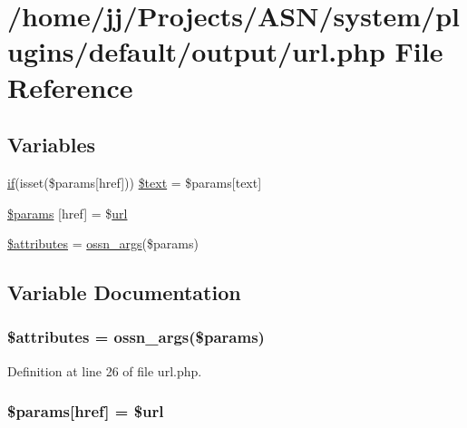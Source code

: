 \hypertarget{url_8php}{}\section{/home/jj/\+Projects/\+A\+S\+N/system/plugins/default/output/url.php File Reference}
\label{url_8php}
\subsection*{Variables}
\begin{DoxyCompactItemize}
\item 
\hyperlink{jquery_8tokeninput_8js_ad8dd46a3cbc004569e34401e9e71771a}{if}(isset(\$params\mbox{[}\textquotesingle{}href\textquotesingle{}\mbox{]})) \hyperlink{url_8php_abf91aba7b91b5ea106c98d5df48b292a}{\$text} = \$params\mbox{[}\textquotesingle{}text\textquotesingle{}\mbox{]}
\item 
\hyperlink{url_8php_a4ebe9a94549ed2e76df3550ae56761b1}{\$params} \mbox{[}\textquotesingle{}href\textquotesingle{}\mbox{]} = \$\hyperlink{ossn_8config_8site_8example_8php_ad643c3db2725019ef8130393d549e6db}{url}
\item 
\hyperlink{url_8php_adc851f7a62250e75df0490c0280aef4c}{\$attributes} = \hyperlink{ossn_8lib_8views_8php_a90922f09de8a06ea85351afb51fac9f7}{ossn\+\_\+args}(\$params)
\end{DoxyCompactItemize}


\subsection{Variable Documentation}
\subsubsection[{\texorpdfstring{\$attributes}{$attributes}}]{\setlength{\rightskip}{0pt plus 5cm}\$attributes = {\bf ossn\+\_\+args}(\$params)}\hypertarget{url_8php_adc851f7a62250e75df0490c0280aef4c}{}\label{url_8php_adc851f7a62250e75df0490c0280aef4c}


Definition at line 26 of file url.\+php.

\subsubsection[{\texorpdfstring{\$params}{$params}}]{\setlength{\rightskip}{0pt plus 5cm}\$params\mbox{[}\textquotesingle{}href\textquotesingle{}\mbox{]} = \${\bf url}}\hypertarget{url_8php_a4ebe9a94549ed2e76df3550ae56761b1}{}\label{url_8php_a4ebe9a94549ed2e76df3550ae56761b1}


